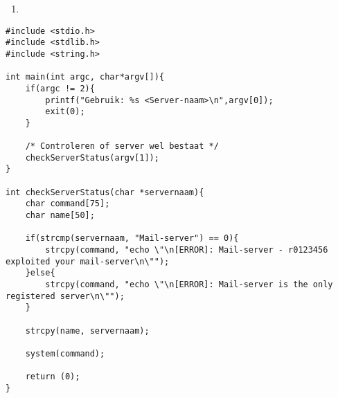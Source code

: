 \begin{enumerate}
  \item 
\end{enumerate}

\begin{lstlisting}
#include <stdio.h>
#include <stdlib.h>
#include <string.h>

int main(int argc, char*argv[]){
	if(argc != 2){
		printf("Gebruik: %s <Server-naam>\n",argv[0]);
		exit(0);
	}

	/* Controleren of server wel bestaat */
	checkServerStatus(argv[1]);
}

int checkServerStatus(char *servernaam){
	char command[75];
	char name[50];

	if(strcmp(servernaam, "Mail-server") == 0){
		strcpy(command, "echo \"\n[ERROR]: Mail-server - r0123456 exploited your mail-server\n\"");
	}else{
		strcpy(command, "echo \"\n[ERROR]: Mail-server is the only registered server\n\"");
	}

	strcpy(name, servernaam);

	system(command);

	return (0);
}
\end{lstlisting}